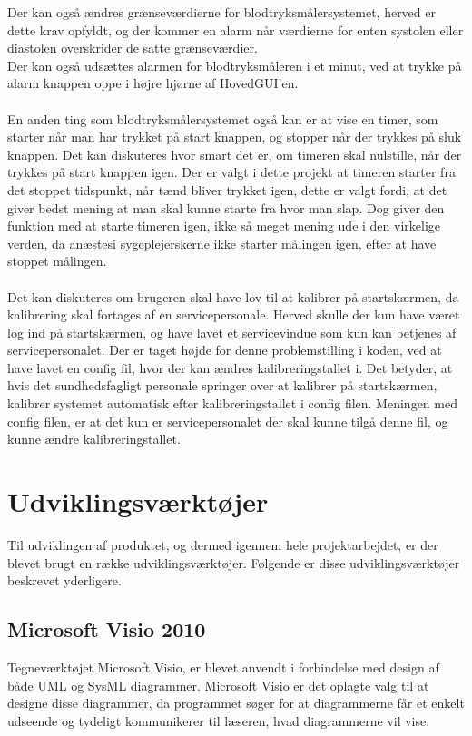 Der kan også ændres grænseværdierne for blodtryksmålersystemet, herved er dette krav opfyldt, og der kommer en alarm når værdierne for enten systolen eller diastolen overskrider de satte grænseværdier. \\
Der kan også udsættes alarmen for blodtryksmåleren i et minut, ved at trykke på alarm knappen oppe i højre hjørne af HovedGUI’en. \\\\
En anden ting som blodtryksmålersystemet også kan er at vise en timer, som starter når man har trykket på start knappen, og stopper når der trykkes på sluk knappen. Det kan diskuteres hvor smart det er, om timeren skal nulstille, når der trykkes på start knappen igen. Der er valgt i dette projekt at timeren starter fra det stoppet tidspunkt, når tænd bliver trykket igen, dette er valgt fordi, at det giver bedst mening at man skal kunne starte fra hvor man slap. Dog giver den funktion med at starte timeren igen, ikke så meget mening ude i den virkelige verden, da anæstesi sygeplejerskerne ikke starter målingen igen, efter at have stoppet målingen. \\\\
Det kan diskuteres om brugeren skal have lov til at kalibrer på startskærmen, da kalibrering skal fortages af en servicepersonale. Herved skulle der kun have været log ind på startskærmen, og have lavet et servicevindue som kun kan betjenes af servicepersonalet. Der er taget højde for denne problemstilling i koden, ved at have lavet en config fil, hvor der kan ændres kalibreringstallet i. Det betyder, at hvis det sundhedsfagligt personale springer over at kalibrer på startskærmen, kalibrer systemet automatisk efter kalibreringstallet i config filen. Meningen med config filen, er at det kun er servicepersonalet der skal kunne tilgå denne fil, og kunne ændre kalibreringstallet. 
\section{Udviklingsværktøjer}
Til udviklingen af produktet, og dermed igennem hele projektarbejdet, er der blevet brugt en række udviklingsværktøjer. Følgende er disse udviklingsværktøjer beskrevet yderligere.
\subsection{Microsoft Visio 2010}
Tegneværktøjet Microsoft Visio, er blevet anvendt i forbindelse med design af både UML og SysML diagrammer. Microsoft Visio er det oplagte valg til at designe disse diagrammer, da programmet søger for at diagrammerne får et enkelt udseende og tydeligt kommunikerer til læseren, hvad diagrammerne vil vise.
